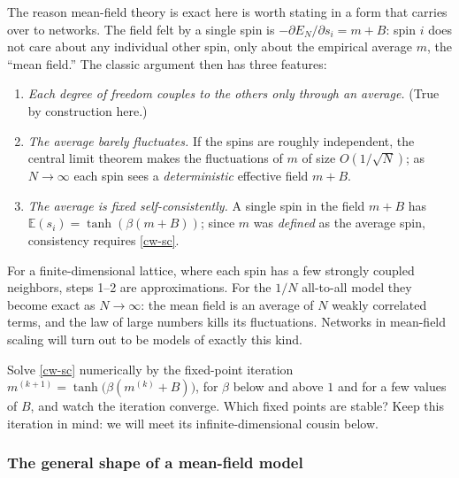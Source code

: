 \documentclass[11pt]{article}
\newcommand{\E}{\mathbb{E}}
\newcommand{\pd}{\partial}
\begin{document}
The reason mean-field theory is exact here is worth stating in a form that carries over to networks. The field felt by a single spin is $-\pd E_N/\pd s_i = m + B$: spin $i$ does not care about any individual other spin, only about the empirical average $m$, the ``mean field.'' The classic argument then has three features:
%
\begin{enumerate}
    \item \emph{Each degree of freedom couples to the others only through an average.} (True by construction here.)
    \item \emph{The average barely fluctuates.} If the spins are roughly independent, the central limit theorem makes the fluctuations of $m$ of size $O(1/\sqrt N)$; as $N\to\infty$ each spin sees a \emph{deterministic} effective field $m+B$.
    \item \emph{The average is fixed self-consistently.} A single spin in the field $m+B$ has $\E(s_i) = \tanh(\beta(m+B))$; since $m$ was \emph{defined} as the average spin, consistency requires \eqref{cw-sc}.
\end{enumerate}
%
For a finite-dimensional lattice, where each spin has a few strongly coupled neighbors, steps 1--2 are approximations. For the $1/N$ all-to-all model they become exact as $N\to\infty$: the mean field is an average of $N$ weakly correlated terms, and the law of large numbers kills its fluctuations. Networks in mean-field scaling will turn out to be models of exactly this kind.

\begin{exercise}
\label{ex:cw}
Solve \eqref{cw-sc} numerically by the fixed-point iteration $m^{(k+1)} = \tanh\big(\beta(m^{(k)}+B)\big)$, for $\beta$ below and above $1$ and for a few values of $B$, and watch the iteration converge. Which fixed points are stable? Keep this iteration in mind: we will meet its infinite-dimensional cousin below.
\end{exercise}

\subsubsection{The general shape of a mean-field model}
\end{document}
